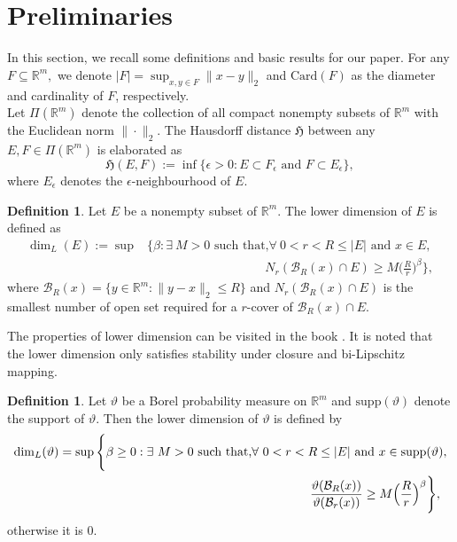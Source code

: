 \documentclass{amsproc}
\theoremstyle{definition}
\newtheorem{definition}[theorem]{Definition}
\theoremstyle{remark}
\numberwithin{equation}{section}
\begin{document}
\section{Preliminaries} \label{Sec2}
In this section, we recall some definitions and basic results for our paper. For any $F\subseteq\mathbb{R}^m,$ we denote $|F|=\sup_{x,y\in F}\|x-y\|_2$ and $\text{Card}(F)$ as the diameter and cardinality of $F$, respectively. \\
Let $\Pi(\mathbb{R}^m)$ denote the collection of all compact nonempty subsets of $\mathbb{R}^m$ with the Euclidean norm $\|\cdot\|_2$. The Hausdorff distance $\mathfrak{H}$ between any $E,F\in\Pi(\mathbb{R}^m)$ is elaborated as 
$$\mathfrak{H}(E,F):=\inf\{\epsilon>0: E\subset F_\epsilon \text{ and } F\subset E_\epsilon\},$$ where $E_\epsilon$ denotes the $\epsilon$-neighbourhood of $E.$
\begin{definition}\cite{Fraser}
    Let $E$ be a nonempty subset of $\mathbb{R}^m.$ The lower dimension of $E$ is defined as
    \begin{align*}
       \dim_{L}(E):=\sup&\Big\{\beta: \exists ~M>0 \text{ such that,} \forall ~0<r<R\le|E| \text{ and }x\in E, \\& \hspace{4cm}N_r(\mathcal{B}_R(x)\cap E)\ge M\Big(\frac{R}{r}\Big)^\beta\Big\},
    \end{align*}
where $\mathcal{B}_R(x)=\{y\in\mathbb{R}^m:\|y-x\|_2\le R\}$ and $N_r(\mathcal{B}_R(x)\cap E)$ is the smallest number of open set required for a $r$-cover of $\mathcal{B}_R(x)\cap E.$    
\end{definition}
The properties of lower dimension can be visited in the book \cite{Fraser}. It is noted that the lower dimension only satisfies stability under closure and bi-Lipschitz mapping.
\begin{definition}\cite{Fraser}
 Let $\vartheta$ be a Borel probability measure on $\mathbb{R}^m$ and $\text{supp}(\vartheta)$ denote the support of $\vartheta.$ Then the lower dimension of $\vartheta$ is defined by
 \begin{align*}
\dim_L(\vartheta)=\sup\Bigg\{&\beta\ge0:\exists ~M>0 \text{ such that,} \forall ~0<r<R\le|E| \text{ and }x\in \text{supp}(\vartheta),\\& \hspace{5.8cm}\frac{\vartheta(\mathcal{B}_R(x))}{\vartheta(\mathcal{B}_r(x))}\ge M\Big(\frac{R}{r}\Big)^\beta\Bigg\},
 \end{align*}
otherwise it is $0.$
    \end{definition}
\end{document}
